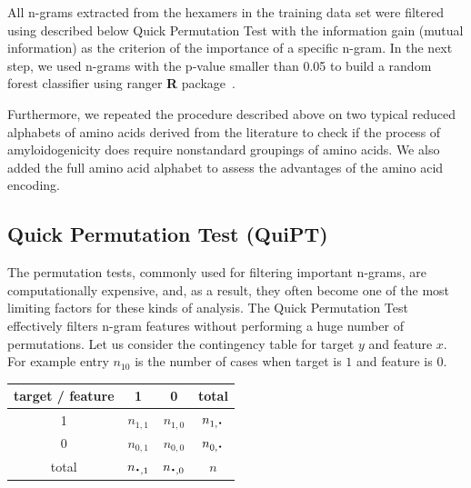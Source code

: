 \documentclass{bioinfo}
\newcommand*{\bigcdot}{\raisebox{-0.25ex}{\scalebox{1.5}{$\cdot$}}}
\begin{document}
\begin{methods}
  All n-grams extracted from the hexamers in the training data set were filtered 
using described below Quick Permutation Test with the information gain (mutual 
information) as the criterion of the importance of a specific n-gram. In the 
next step, we used n-grams with the p-value smaller than 0.05 to build a random 
forest classifier using ranger \textbf{R} package~\citep{wright_ranger:_2015}. 

  Furthermore, we repeated the procedure described above on two typical reduced 
alphabets of amino acids derived from the literature to check if the process of 
%
%
%
%
%
amyloidogenicity does require nonstandard groupings of amino acids. We also 
added the full amino acid alphabet to assess the advantages of the amino acid 
encoding.

\subsection{Quick Permutation Test (QuiPT)}

The permutation tests, commonly used for filtering important n-grams, are 
computationally expensive, and, as a result, they often become one of the most
limiting factors for these kinds of analysis. 
The Quick Permutation Test effectively filters 
n-gram features without performing a huge number of permutations. Let us 
consider the contingency table for target $y$ and feature $x$. For example 
entry $n_{10}$ is the number of cases when target is $1$ and feature is $0$.

\begin{center}
\begin{tabular}{ | c || c | c | c | }
  \hline			
  target / feature & 1 & 0 & total\\ \hline
 1 & $n_{1,1}$ & $n_{1,0}$ & $n_{1,\bigcdot}$ \\
 0 & $n_{0,1}$ & $n_{0,0}$ & $n_{0,\bigcdot}$ \\ \hline
 total & $n_{\bigcdot,1}$ & $n_{\bigcdot,0}$ & $n$ \\
  \hline  
\end{tabular} 
\end{center}


\end{methods}
\end{document}

